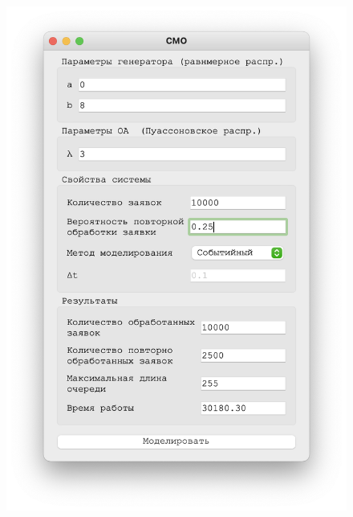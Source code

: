  \begin{figure}[!htb]
    \begin{minipage}{0.55\textwidth}
      \centering
      \includegraphics[width=1\linewidth]{3-25-s}
    \end{minipage}\hfill
    \begin{minipage}{0.55\textwidth}
      \centering

\end{minipage}
\end{figure}

